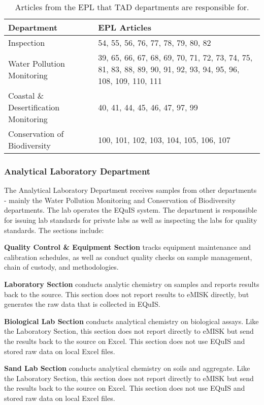 \begin{table}[!htpb]
\centering
\caption{Articles from the EPL that TAD departments are responsible for.}
\label{tab:tadarts}
\begin{tabular}{@{}p{6cm}p{6cm}@{}}
\toprule
\textbf{Department} & \textbf{EPL Articles} \\ \midrule
Inspection & 54, 55, 56, 76, 77, 78, 79, 80, 82 \\
Water Pollution Monitoring & 39, 65, 66, 67, 68, 69, 70, 71, 72, 73, 74, 75, 81, 83, 88, 89, 90, 91, 92, 93, 94, 95, 96, 108, 109, 110, 111 \\
Coastal \& Desertification Monitoring & 40, 41, 44, 45, 46, 47, 97, 99 \\
Conservation of Biodiversity & 100, 101, 102, 103, 104, 105, 106, 107 \\ \bottomrule
\end{tabular}
\end{table}

\subsubsection{Analytical Laboratory Department}

The Analytical Laboratory Department receives samples from other departments - mainly the Water Pollution Monitoring and Conservation of Biodiversity departments. The lab operates the EQuIS system. The department is responsible for issuing lab standards for private labs as well as inspecting the labs for quality standards. The sections include:

\textbf{Quality Control \& Equipment Section} tracks equipment maintenance and calibration schedules, as well as conduct quality checks on sample management, chain of custody, and methodologies.

\textbf{Laboratory Section} conducts analytic chemistry on samples and reports results back to the source. This section does not report results to eMISK directly, but generates the raw data that is collected in EQuIS.

\textbf{Biological Lab Section} conducts analytical chemistry on biological assays. Like the Laboratory Section, this section does not report directly to eMISK but send the results back to the source on Excel. This section does not use EQuIS and stored raw data on local Excel files.

\textbf{Sand Lab Section} conducts analytical chemistry on soils and aggregate. Like the Laboratory Section, this section does not report directly to eMISK but send the results back to the source on Excel. This section does not use EQuIS and stored raw data on local Excel files.

